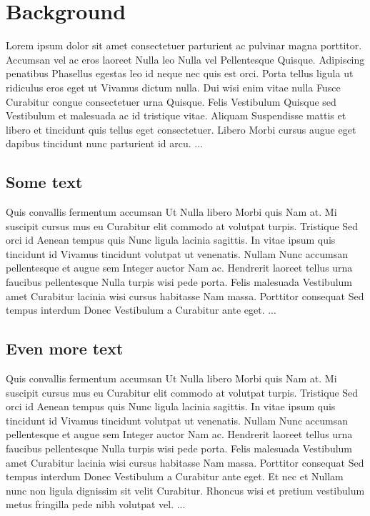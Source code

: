 \chapter{Background} \label{chap:background}

Lorem ipsum dolor sit amet consectetuer parturient ac pulvinar magna porttitor. Accumsan vel ac eros laoreet Nulla leo Nulla vel Pellentesque Quisque. Adipiscing penatibus Phasellus egestas leo id neque nec quis est orci. Porta tellus ligula ut ridiculus eros eget ut Vivamus dictum nulla. Dui wisi enim vitae nulla Fusce Curabitur congue consectetuer urna Quisque. Felis Vestibulum Quisque sed Vestibulum et malesuada ac id tristique vitae. Aliquam Suspendisse mattis et libero et tincidunt quis tellus eget consectetuer. Libero Morbi cursus augue eget dapibus tincidunt nunc parturient id arcu.
...

\section{Some text}
Quis convallis fermentum accumsan Ut Nulla libero Morbi quis Nam at. Mi suscipit cursus mus eu Curabitur elit commodo at volutpat turpis. Tristique Sed orci id Aenean tempus quis Nunc ligula lacinia sagittis. In vitae ipsum quis tincidunt id Vivamus tincidunt volutpat ut venenatis. Nullam Nunc accumsan pellentesque et augue sem Integer auctor Nam ac. Hendrerit laoreet tellus urna faucibus pellentesque Nulla turpis wisi pede porta. Felis malesuada Vestibulum amet Curabitur lacinia wisi cursus habitasse Nam massa. Porttitor consequat Sed tempus interdum Donec Vestibulum a Curabitur ante eget.
...

\section{Even more text}
Quis convallis fermentum accumsan Ut Nulla libero Morbi quis Nam at. Mi suscipit cursus mus eu Curabitur elit commodo at volutpat turpis. Tristique Sed orci id Aenean tempus quis Nunc ligula lacinia sagittis. In vitae ipsum quis tincidunt id Vivamus tincidunt volutpat ut venenatis. Nullam Nunc accumsan pellentesque et augue sem Integer auctor Nam ac. Hendrerit laoreet tellus urna faucibus pellentesque Nulla turpis wisi pede porta. Felis malesuada Vestibulum amet Curabitur lacinia wisi cursus habitasse Nam massa. Porttitor consequat Sed tempus interdum Donec Vestibulum a Curabitur ante eget. Et nec et Nullam nunc non ligula dignissim sit velit Curabitur. Rhoncus wisi et pretium vestibulum metus fringilla pede nibh volutpat vel. ...

